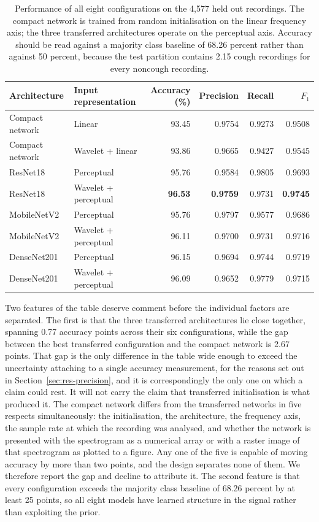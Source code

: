 \documentclass[pdflatex,sn-mathphys-num]{sn-jnl}
\begin{document}
\begin{table}[t]
\centering
\footnotesize
\caption{Performance of all eight configurations on the 4,577 held out
recordings. The compact network is trained from random initialisation on the
linear frequency axis; the three transferred architectures operate on the
perceptual axis. Accuracy should be read against a majority class baseline of
68.26 percent rather than against 50 percent, because the test partition
contains 2.15 cough recordings for every noncough recording.}
\label{tab:main}
\begin{tabular}{@{}llrrrr@{}}
\toprule
Architecture & Input representation & Accuracy (\%) & Precision & Recall & $F_1$ \\
\midrule
Compact network & Linear & 93.45 & 0.9754 & 0.9273 & 0.9508 \\
Compact network & Wavelet + linear & 93.86 & 0.9665 & 0.9427 & 0.9545 \\
ResNet18 & Perceptual & 95.76 & 0.9584 & 0.9805 & 0.9693 \\
ResNet18 & Wavelet + perceptual & \textbf{96.53} & \textbf{0.9759} & 0.9731 & \textbf{0.9745} \\
MobileNetV2 & Perceptual & 95.76 & 0.9797 & 0.9577 & 0.9686 \\
MobileNetV2 & Wavelet + perceptual & 96.11 & 0.9700 & 0.9731 & 0.9716 \\
DenseNet201 & Perceptual & 96.15 & 0.9694 & 0.9744 & 0.9719 \\
DenseNet201 & Wavelet + perceptual & 96.09 & 0.9652 & 0.9779 & 0.9715 \\
\bottomrule
\end{tabular}
\end{table}

Two features of the table deserve comment before the individual factors are
separated. The first is that the three transferred architectures lie close
together, spanning 0.77 accuracy points across their six configurations, while
the gap between the best transferred configuration and the compact network is
2.67 points. That gap is the only difference in the table wide enough to
exceed the uncertainty attaching to a single accuracy measurement, for the
reasons set out in Section~\ref{sec:res-precision}, and it is correspondingly
the only one on which a claim could rest. It will not carry the claim that
transferred initialisation is what produced it. The compact network differs
from the transferred networks in five respects simultaneously: the
initialisation, the architecture, the frequency axis, the sample rate at which
the recording was analysed, and whether the network is presented with the
spectrogram as a numerical array or with a raster image of that spectrogram as
plotted to a figure. Any one of the five is capable of moving accuracy by more
than two points, and the design separates none of them. We therefore report
the gap and decline to attribute it. The second feature is that every
configuration exceeds the majority class baseline of 68.26 percent by at least
25 points, so all eight models have learned structure in the signal rather
than exploiting the prior.
\end{document}
